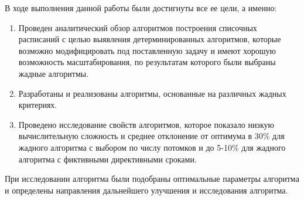 В ходе выполнения данной работы были достигнуты все ее цели, а именно:
\begin{enumerate}
    \item Проведен аналитический обзор алгоритмов построения списочных расписаний с целью выявления детерминированных алгоритмов, которые возможно модифицировать под поставленную задачу и имеют хорошую возможность масштабирования, по результатам которого были выбраны жадные алгоритмы.
    \item Разработаны и реализованы алгоритмы, основанные на различных жадных критериях.
    \item Проведено исследование свойств алгоритмов, которое показало низкую вычислительную сложность и среднее отклонение от оптимума в 30\% для жадного алгоритма с выбором по числу потомков и до 5-10\% для жадного алгоритма с фиктивными директивными сроками.
\end{enumerate}

При исследовании алгоритма были подобраны оптимальные параметры алгоритма и определены направления дальнейшего улучшения и исследования алгоритма.